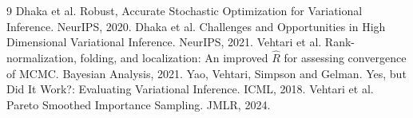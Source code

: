 \documentclass[11pt,a4paper]{article}
\begin{document}
\begingroup\small
\begin{thebibliography}{9}\setlength{\itemsep}{1pt}\setlength{\parskip}{0pt}
 Dhaka et al. Robust, Accurate Stochastic Optimization for Variational Inference. NeurIPS, 2020.
 Dhaka et al. Challenges and Opportunities in High Dimensional Variational Inference. NeurIPS, 2021.
 Vehtari et al. Rank-normalization, folding, and localization: An improved $\hat R$ for assessing convergence of MCMC. Bayesian Analysis, 2021.
 Yao, Vehtari, Simpson and Gelman. Yes, but Did It Work?: Evaluating Variational Inference. ICML, 2018.
 Vehtari et al. Pareto Smoothed Importance Sampling. JMLR, 2024.
\end{thebibliography}\endgroup
\end{document}
